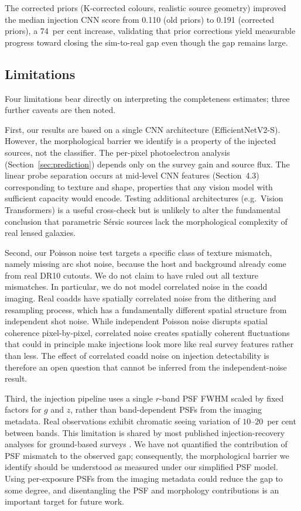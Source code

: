 \documentclass[fleqn,usenatbib]{mnras}
\begin{document}
The corrected priors (K-corrected colours, realistic source geometry) improved the median injection CNN score from 0.110 (old priors) to 0.191 (corrected priors), a 74~per cent increase, validating that prior corrections yield measurable progress toward closing the sim-to-real gap even though the gap remains large.

\subsection{Limitations}

Four limitations bear directly on interpreting the completeness estimates; three further caveats are then noted.

First, our results are based on a single CNN architecture (EfficientNetV2-S).  However, the morphological barrier we identify is a property of the injected sources, not the classifier.  The per-pixel photoelectron analysis (Section~\ref{sec:prediction}) depends only on the survey gain and source flux.  The linear probe separation occurs at mid-level CNN features (Section~4.3) corresponding to texture and shape, properties that any vision model with sufficient capacity would encode.  Testing additional architectures (e.g.\ Vision Transformers) is a useful cross-check but is unlikely to alter the fundamental conclusion that parametric S\'{e}rsic sources lack the morphological complexity of real lensed galaxies.

Second, our Poisson noise test targets a specific class of texture mismatch, namely missing arc shot noise, because the host and background already come from real DR10 cutouts.  We do not claim to have ruled out all texture mismatches.  In particular, we do not model correlated noise in the coadd imaging.  Real coadds have spatially correlated noise from the dithering and resampling process, which has a fundamentally different spatial structure from independent shot noise.  While independent Poisson noise disrupts spatial coherence pixel-by-pixel, correlated noise creates spatially coherent fluctuations that could in principle make injections look more like real survey features rather than less.  The effect of correlated coadd noise on injection detectability is therefore an open question that cannot be inferred from the independent-noise result.

Third, the injection pipeline uses a single $r$-band PSF FWHM scaled by fixed factors for $g$ and $z$, rather than band-dependent PSFs from the imaging metadata.  Real observations exhibit chromatic seeing variation of $10$--$20$~per cent between bands.  This limitation is shared by most published injection-recovery analyses for ground-based surveys \citep{Herle2024}.  We have not quantified the contribution of PSF mismatch to the observed gap; consequently, the morphological barrier we identify should be understood as measured under our simplified PSF model.  Using per-exposure PSFs from the imaging metadata could reduce the gap to some degree, and disentangling the PSF and morphology contributions is an important target for future work.
\end{document}
